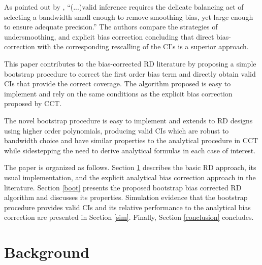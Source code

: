 \documentclass[12pt,fleqn]{article}
\begin{document}
As pointed out by \cite{ccf2016}, ``(...)valid inference
requires the delicate balancing act of selecting a bandwidth small enough
to remove smoothing bias, yet large enough to ensure adequate precision.''
The authors compare the strategies of undersmoothing, and explicit bias 
correction concluding that direct bias-correction with the corresponding 
rescalling of the CI's is a superior approach.

This paper contributes to the bias-corrected RD literature by proposing a simple
bootstrap procedure to correct the first order bias term and directly obtain 
valid CIs that provide the correct coverage. The algorithm proposed is easy to
implement and rely on the same conditions as the explicit bias correction
proposed by CCT.

The novel bootstrap procedure is easy to implement and extends to RD designs 
using higher order polynomials, producing valid CIs which are robust to 
bandwidth choice and have similar properties to the analytical procedure in 
CCT while sidestepping the need to derive analytical formulas in each case of interest.

The paper is organized as follows. Section \ref{background} describes the basic
RD approach, its usual implementation, and the explicit analytical bias 
correction approach in the literature. Section \ref{boot} presents the proposed 
bootstrap bias corrected RD algorithm and discusses its properties. Simulation
evidence that the bootstrap procedure provides valid CIs and its relative 
performance to the analytical bias correction are presented in Section \ref{sim}.
Finally, Section \ref{conclusion} concludes.

\section{Background}\label{background}
\end{document}
